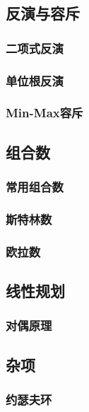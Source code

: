\documentclass[a4paper, twoside]{article}
\begin{document}
\begin{multicols}{2}
			\subsection{反演与容斥}
				\subsubsection{二项式反演}
					
				\subsubsection{单位根反演}
					
				\subsubsection{Min-Max容斥}
					
			
			\subsection{组合数}
				\subsubsection{常用组合数}
					
				\subsubsection{斯特林数}
					
				\subsubsection{欧拉数}
					

			\subsection{线性规划}
				\subsubsection{对偶原理}
					
				
			\subsection{杂项}
				\subsubsection{约瑟夫环}
					\inputminted{cpp}{../src-midori/math/约瑟夫环.cpp}

\end{multicols}
\end{document}
